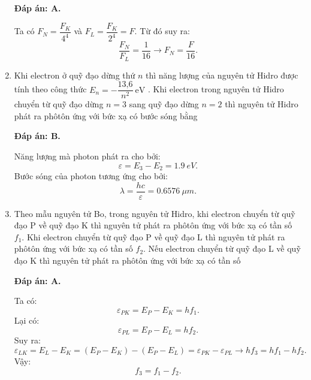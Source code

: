 \begin{enumerate}[label=\bfseries Câu \arabic*:]
	\loigiai
	{		\textbf{Đáp án: A.}
		
Ta có $ F_{N} = \dfrac{F_{K}}{4^{4}} $ và $ F_{L} = \dfrac{F_{K}}{2^{4}} = F $. Từ đó suy ra:
$$
	\dfrac{F_{N}}{F_{L}} = \dfrac{1}{16} \rightarrow F_{N} = \dfrac{F}{16}.
$$
		
	}
	
	\item {} 
	
	\cauhoi
	{Khi electron ở quỹ đạo dừng thứ $n$ thì năng lượng của nguyên tử Hidro được tính theo công thức $E_n=-\dfrac{\text{13,6}}{n^2}\ \text{eV}$  . Khi electron trong nguyên tử Hidro chuyển từ quỹ đạo dừng $n = 3$ sang quỹ đạo dừng $n = 2$ thì nguyên tử Hidro phát ra phôtôn ứng với bức xạ có bước sóng bằng
	}
	
	\loigiai
	{		\textbf{Đáp án: B.}
		
Năng lượng mà photon phát ra cho bởi:
$$
	\varepsilon = E_{3} - E_{2} = \SI{1,9}{eV}.
$$
Bước sóng của photon tương ứng cho bởi:
$$
	\lambda = \dfrac{hc}{\varepsilon} = \SI{0,6576}{\mu m}.
$$
	}
	
	\item {} 
	
	\cauhoi
	{Theo mẫu nguyên tử Bo, trong nguyên tử Hidro, khi electron chuyển từ quỹ đạo P về quỹ đạo K thì nguyên tử phát ra phôtôn ứng với bức xạ có tần số $f_1$. Khi electron chuyển từ quỹ đạo P về quỹ đạo L thì nguyên tử phát ra phôtôn ứng với bức xạ có tần số $f_2$. Nếu electron chuyển từ quỹ đạo L về quỹ đạo K thì nguyên tử phát ra phôtôn ứng với bức xạ có tần số
	}
	
	\loigiai
	{		\textbf{Đáp án: A.}
		
Ta có:
$$
	\varepsilon_{PK} = E_{P} - E_{K} = hf_{1}.
$$
Lại có:
$$
	\varepsilon_{PL} = E_{P} - E_{L} = hf_{2}.
$$
Suy ra:
$$
	\varepsilon_{LK} = E_{L} - E_{K} = (E_{P} - E_{K}) - (E_{P} - E_{L}) = \varepsilon_{PK} - \varepsilon_{PL} \rightarrow hf_{3} = hf_{1} - hf_{2}.
$$
Vậy:
$$
	f_{3} = f_{1} - f_{2}.
$$
		
}
\end{enumerate}
